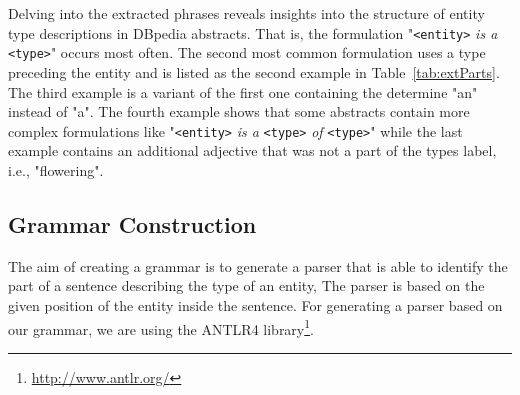 Delving into the extracted phrases reveals insights into the structure of entity type descriptions in DBpedia abstracts.
That is, the formulation "\texttt{<entity>} \emph{is a} \texttt{<type>}" occurs most often.
The second most common formulation uses a type preceding the entity and is listed as the second example in Table~\ref{tab:extParts}.
The third example is a variant of the first one containing the determine "an" instead of "a".
The fourth example shows that some abstracts contain more complex formulations like "\texttt{<entity>} \emph{is a} \texttt{<type>} \emph{of} \texttt{<type>}" while the last example contains an additional adjective that was not a part of the types label, i.e., "flowering".

\begin{table}[htb!]
\centering
{}
\caption{Examples of sentence parts found between an entity and its type.}
\label{tab:extParts}
\end{table}

\subsection{Grammar Construction}
\label{sec:grammar}

The aim of creating a grammar is to generate a parser that is able to identify the part of a sentence describing  the type of an entity,
The parser is based on the given position of the entity inside the sentence.
For generating a parser based on our grammar, we are using the ANTLR4 library\footnote{\url{http://www.antlr.org/}}.

